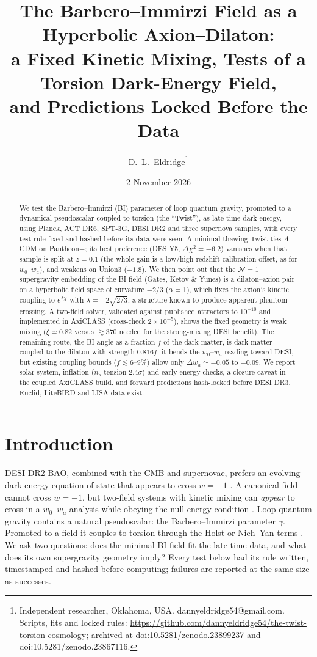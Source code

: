 \documentclass[11pt]{article}
\title{\textbf{The Barbero--Immirzi Field as a Hyperbolic Axion--Dilaton:\\
a Fixed Kinetic Mixing, Tests of a Torsion Dark-Energy Field,\\ and Predictions Locked Before the Data}}
\author{D.~L.~Eldridge\thanks{Independent researcher, Oklahoma, USA. dannyeldridge54@gmail.com.
Scripts, fits and locked rules: \url{https://github.com/dannyeldridge54/the-twist-torsion-cosmology};
archived at doi:10.5281/zenodo.23899237 and doi:10.5281/zenodo.23867116.}}
\date{2 November 2026}
\begin{document}
\sloppy
\maketitle

\begin{abstract}
We test the Barbero--Immirzi (BI) parameter of loop quantum gravity, promoted to a dynamical pseudoscalar coupled to
torsion (the ``Twist''), as late-time dark energy, using Planck, ACT DR6, SPT-3G, DESI DR2 and three supernova
samples, with every test rule fixed and hashed before its data were seen. A minimal thawing Twist ties $\Lambda$CDM
on Pantheon+; its best preference (DES Y5, $\Delta\chi^2=-6.2$) vanishes when that sample is split at $z=0.1$ (the
whole gain is a low/high-redshift calibration offset, as for $w_0$--$w_a$), and weakens on Union3 ($-1.8$). We then
point out that the $\mathcal N=1$ supergravity embedding of the BI field (Gates, Ketov \& Yunes) is a dilaton--axion
pair on a hyperbolic field space of curvature $-2/3$ ($\alpha=1$), which fixes the axion's kinetic coupling to
$e^{\lambda\chi}$ with $\lambda=-2\sqrt{2/3}$, a structure known to produce apparent phantom crossing. A two-field solver,
validated against published attractors to $10^{-10}$ and implemented in AxiCLASS (cross-check $2\times10^{-5}$), shows
the fixed geometry is weak mixing ($\xi\simeq0.82$ versus $\gtrsim370$ needed for the strong-mixing DESI benefit). The
remaining route, the BI angle as a fraction $f$ of the dark matter, is dark matter coupled to the dilaton with strength
$0.816f$; it bends the $w_0$--$w_a$ reading toward DESI, but existing coupling bounds ($f\lesssim6$--$9\%$) allow only
$\Delta w_a\simeq-0.05$ to $-0.09$. We report solar-system, inflation ($n_s$ tension $2.4\sigma$) and early-energy
checks, a closure caveat in the coupled AxiCLASS build, and forward predictions hash-locked before DESI DR3, Euclid,
LiteBIRD and LISA data exist.
\end{abstract}

\section{Introduction}
DESI DR2 BAO, combined with the CMB and supernovae, prefers an evolving dark-energy equation of state that appears to
cross $w=-1$ \cite{desi2025}. A canonical field cannot cross $w=-1$, but two-field systems with kinetic mixing can
\emph{appear} to cross in a $w_0$--$w_a$ analysis while obeying the null energy condition \cite{toomey2025,ramos2026}.
Loop quantum gravity contains a natural pseudoscalar: the Barbero--Immirzi parameter $\gamma$. Promoted to a field it
couples to torsion through the Holst or Nieh--Yan terms \cite{taveras2008,calcagni2009}. We ask two questions:
does the minimal BI field fit the late-time data, and what does its own supergravity geometry imply? Every test below
had its rule written, timestamped and hashed before computing; failures are reported at the same size as successes.
\end{document}
